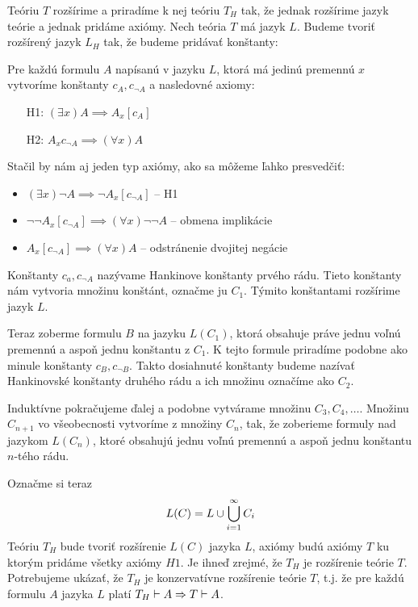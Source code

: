 \begin{dokaz}
    Teóriu $T$ rozšírime a priradíme k nej teóriu $T_H$ tak, že
    jednak rozšírime jazyk teórie a jednak pridáme axiómy.
    Nech teória $T$ má jazyk $L$.
    Budeme tvoriť rozšírený jazyk $L_H$ tak, že budeme pridávať konštanty:

    Pre každú formulu $A$ napísanú v jazyku $L$,
    ktorá má jedinú premennú $x$ vytvoríme konštanty $c_A, c_{\neg A}$
    a nasledovné axiomy: 
    \begin{itemize}
        \item[H1:]  $(\exists x) A \implies A_x[c_A]$
        \item[H2:]  $A_x{c_{\neg A}} \implies (\forall x) A$
    \end{itemize}

    Stačil by nám aj jeden typ axiómy, ako sa môžeme ľahko presvedčiť:
    \begin{itemize}
        \item $(\exists x) \neg A \implies \neg A_x[c_{\neg A}]$ -- H1
        \item $\neg \neg A_x[c_{\neg A}] \implies
                (\forall x) \neg \neg A$ -- obmena implikácie
        \item $A_x[c_{\neg A}] \implies (\forall x) A$ -- odstránenie
            dvojitej negácie
    \end{itemize}

    Konštanty $c_a, c_{\neg A}$ nazývame Hankinove konštanty prvého
    rádu. Tieto konštanty nám vytvoria množinu konštánt, označme ju
    $C_1$. Týmito konštantami rozšírime jazyk $L$.
    
    Teraz zoberme formulu $B$ na jazyku $L(C_1)$, ktorá obsahuje práve
    jednu voľnú premennú a aspoň jednu konštantu z $C_1$. K tejto
    formule priradíme podobne ako minule konštanty $c_B, c_{\neg B}$.
    Takto dosiahnuté konštanty budeme nazívať Hankinovské konštanty
    druhého rádu a ich množinu označíme ako $C_2$.
    
    Induktívne pokračujeme ďalej a podobne vytvárame množinu $C_3,
    C_4, \dots$.
    Množinu $C_{n+1}$ vo všeobecnosti vytvoríme z množiny $C_n$, tak,
    že zoberieme formuly nad jazykom $L(C_n)$, ktoré obsahujú jednu
    voľnú premennú a aspoň jednu konštantu $n$-tého rádu.

    Označme si teraz
    \begin{equation*}
        L(C) = L \cup \bigcup_{i=1}^{\infty} C_i
    \end{equation*}
    Teóriu $T_H$ bude tvoriť rozšírenie $L(C)$ jazyka $L$,
    axiómy budú axiómy $T$ ku ktorým pridáme všetky axiómy $H1$.
    Je ihneď zrejmé, že $T_H$ je rozšírenie teórie $T$.
    Potrebujeme ukázať, že $T_H$ je konzervatívne rozšírenie teórie $T$, t.j.
    že pre každú formulu $A$ jazyka $L$ platí 
    $T_H \vdash A \Rightarrow T \vdash A$.


\end{dokaz}
